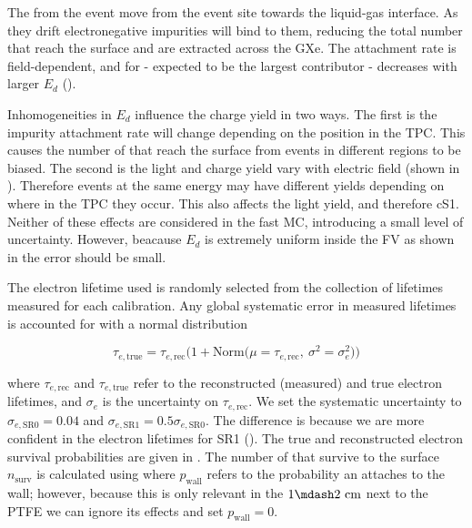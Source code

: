 The \electron from the event move from the event site towards the liquid-gas interface.  As they drift electronegative
impurities will bind to them, reducing the total number that reach the surface and are extracted across the GXe.  The attachment rate
is field-dependent, and for  - expected to be the largest contributor - decreases with larger $E_d$
().

Inhomogeneities in $E_d$ influence the charge yield in two ways.  The first is the impurity attachment rate will change depending on the
position in the TPC.   This causes the number of \electron that reach the surface from events in different regions to be
biased.  The second is the light and charge yield vary with electric field (shown in
).  Therefore events at the same energy may have
different yields depending on where in the TPC they occur.  This also affects the light yield, and therefore cS1.  Neither of these
effects are considered
in the fast MC, introducing a small level of uncertainty.  However, beacause $E_d$ is extremely uniform inside the FV as shown in
 the error should be small.

The electron lifetime used is randomly selected from the collection of lifetimes measured for each calibration.  Any global
systematic error in measured lifetimes  is accounted for with a normal distribution

\begin{equation}
\tau_{e, \mathrm{true}} = \tau_{e, \mathrm{rec}} \Big( 1 + \mathrm{Norm} \big( \mu = \tau_{e, \mathrm{rec}},\ \sigma^2 = \sigma_{e}^2
\big) \Big)
\label{eq:er_nr_calibrations_parameter_determ_det_phys_elife_true}
\end{equation}

\noindent where $\tau_{e, \mathrm{rec}}$ and $\tau_{e, \mathrm{true}}$ refer to the reconstructed (measured) and true electron
lifetimes, and $\sigma_e$ is the uncertainty on $\tau_{e, \mathrm{rec}}$.  We set the systematic uncertainty to 
$\sigma_{e, \mathrm{SR0}} = 0.04$ and $\sigma_{e, \mathrm{SR1}} = 0.5 \sigma_{e, \mathrm{SR0}}$.  The difference is because we are
more confident in the electron lifetimes for SR1 ().  The true and reconstructed electron
survival probabilities are given in
. The number of \electron that survive to the surface
$n_{\mathrm{surv}}$ is calculated using  where $p_{\mathrm{wall}}$
refers to the probability an \electron attaches to the wall; however, because this is only relevant in the $1 \mdash 2\ \mathrm{cm}$
next to the PTFE we can ignore its effects and set $p_{\mathrm{wall}} = 0$.

